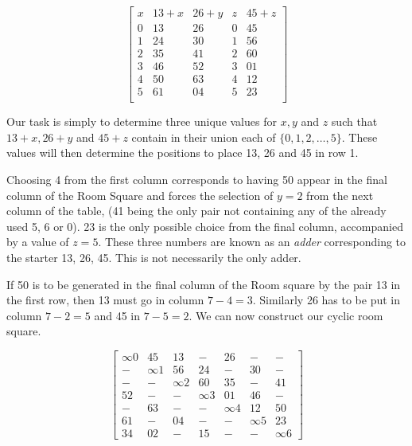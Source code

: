 \documentclass[
  11pt,
  a4paper]{book}
\begin{document}
\begin{equation}
  \begin{bmatrix}
    x &  13 + x & 26 + y & z & 45 + z \\
    0 &    13   &   26   & 0 &   45   \\
    1 &    24   &   30   & 1 &   56   \\
    2 &    35   &   41   & 2 &   60   \\
    3 &    46   &   52   & 3 &   01   \\
    4 &    50   &   63   & 4 &   12   \\
    5 &    61   &   04   & 5 &   23   \\
  \end{bmatrix}
  \label{eq:adder}
\end{equation}

Our task is simply to determine three unique values for \(x, y\) and
\(z\) such that \(13 + x, 26 + y\) and \(45 + z\) contain in their union
each of \(\{0, 1, 2, \ldots, 5\}\). These values will then determine the
positions to place 13, 26 and 45 in row 1.

Choosing 4 from the first column corresponds to having 50 appear in the
final column of the Room Square and forces the selection of \(y = 2\)
from the next column of the table, (41 being the only pair not
containing any of the already used 5, 6 or 0). 23 is the only possible
choice from the final column, accompanied by a value of \(z = 5\). These
three numbers are known as an \emph{adder} corresponding to the starter
13, 26, 45. This is not necessarily the only adder.

If 50 is to be generated in the final column of the Room square by the
pair 13 in the first row, then 13 must go in column \(7 - 4 = 3\).
Similarly 26 has to be put in column \(7 - 2 = 5\) and 45 in
\(7 - 5 = 2\). We can now construct our cyclic room square.

\begin{equation}
  \begin{bmatrix}
    \infty 0 &  45 &  13 &   - &  26 &   - &   - \\
     - &  \infty 1 &  56 &  24 &   - &  30 &   - \\
     - &   - &  \infty 2 &  60 &  35 &   - &  41 \\
    52 &   - &   - &  \infty 3 &  01 &  46 &   - \\
     - &  63 &   - &   - &  \infty 4 &  12 &  50 \\
    61 &   - &  04 &   - &   - &  \infty 5 &  23 \\
    34 &  02 &   - &  15 &   - &   - &  \infty 6 
  \end{bmatrix}
  \label{eq:cyclic-room}
\end{equation}
\end{document}
